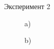 \documentclass{beamer}
\begin{document}
\begin{frame}{Эксперимент 2}
    \begin{figure}[H]
        \begin{minipage}[h]{0.35\linewidth}
             a) \\
        \end{minipage}
        \hfill
        \begin{minipage}[h]{0.35\linewidth}
             b) \\
        \end{minipage}
        \vfill
        \begin{minipage}[h]{0.35\linewidth}

\end{minipage}
\end{figure}
\end{frame}
\end{document}

